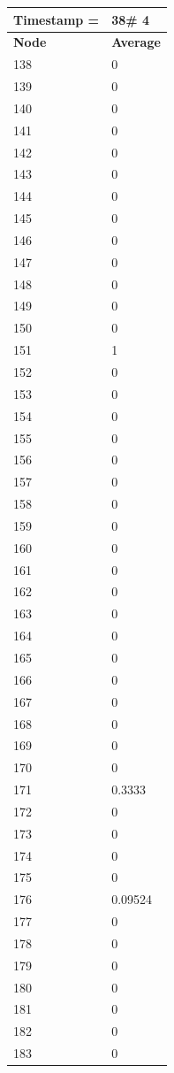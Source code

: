 \begin{tabular}{|l||l|}
\hline
\textbf{Timestamp =} & \textbf{38}\# 4\\\hline
	\textbf{Node} & \textbf{Average} \\ \hline
\hline
	138 & 0 \\ \hline
	139 & 0 \\ \hline
	140 & 0 \\ \hline
	141 & 0 \\ \hline
	142 & 0 \\ \hline
	143 & 0 \\ \hline
	144 & 0 \\ \hline
	145 & 0 \\ \hline
	146 & 0 \\ \hline
	147 & 0 \\ \hline
	148 & 0 \\ \hline
	149 & 0 \\ \hline
	150 & 0 \\ \hline
	151 & 1 \\ \hline
	152 & 0 \\ \hline
	153 & 0 \\ \hline
	154 & 0 \\ \hline
	155 & 0 \\ \hline
	156 & 0 \\ \hline
	157 & 0 \\ \hline
	158 & 0 \\ \hline
	159 & 0 \\ \hline
	160 & 0 \\ \hline
	161 & 0 \\ \hline
	162 & 0 \\ \hline
	163 & 0 \\ \hline
	164 & 0 \\ \hline
	165 & 0 \\ \hline
	166 & 0 \\ \hline
	167 & 0 \\ \hline
	168 & 0 \\ \hline
	169 & 0 \\ \hline
	170 & 0 \\ \hline
	171 & 0.3333 \\ \hline
	172 & 0 \\ \hline
	173 & 0 \\ \hline
	174 & 0 \\ \hline
	175 & 0 \\ \hline
	176 & 0.09524 \\ \hline
	177 & 0 \\ \hline
	178 & 0 \\ \hline
	179 & 0 \\ \hline
	180 & 0 \\ \hline
	181 & 0 \\ \hline
	182 & 0 \\ \hline
	183 & 0 \\ \hline
\end{tabular}
